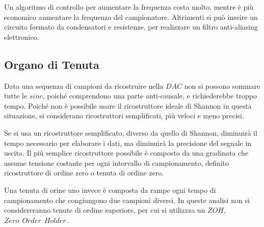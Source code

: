\documentclass{article}
\numberwithin{equation}{subsection}
\begin{document}
Un algoritmo di controllo per aumentare la frequenza costa molto, mentre è più economico aumentare la frequenza del campionatore. Altrimenti si può inseire un circuito formato 
da condensatori e resistenze, per realizzare un filtro anti-aliasing elettronico. 

\subsection{Organo di Tenuta}

Data una sequenza di campioni da ricostruire nella $DAC$ non si possono sommare tutte le $sinc$, poiché comprendono una parte anti-causale, e richiederebbe troppo tempo. 
Poiché non è possibile usare il ricostruttore ideale di Shannon in questa situazione, si considerano ricostruttori semplificati, più veloci e meno precisi. 

Se si usa un ricostruttore semplificato, diverso da quello di Shannon, diminuirà il tempo necessario per elaborare 
i dati, ma diminuirà la precisione del segnale in uscita. Il più semplice ricostruttore possibile è composto 
da una gradinata che assume tensione costante per ogni intervallo di campionamento, definito ricostruttore di ordine zero o tenuta di ordine zero. 

\begin{center}
\end{center}

Una tenuta di orine uno invece è composta da rampe ogni tempo di campionamento che congiungono due campioni diversi. In queste analisi non si considereranno tenute di 
ordine superiore, per cui si utilizzza un $ZOH$, $Zero\:\:Order\:\:Holder$.
\end{document}
